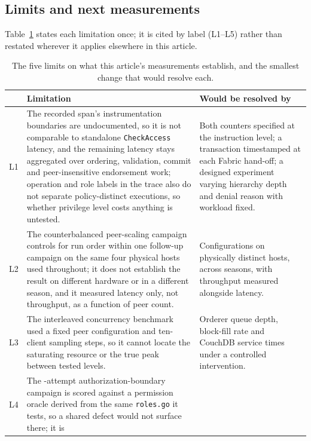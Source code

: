 \documentclass[a4paper,fleqn]{cas-sc}
\begin{document}
\subsection{Limits and next measurements}
\label{subsec:limits}
\label{subsec:threats}

Table~\ref{tab:canonlimits} states each limitation once; it is cited by
label (L1--L5) rather than restated wherever it applies elsewhere in this
article.

\begin{table}[pos=t]
\caption{The five limits on what this article's measurements establish,
  and the smallest change that would resolve each.}
\label{tab:canonlimits}
\small
\begin{tabularx}{\columnwidth}{@{}p{}Xp{}@{}}
\toprule
& Limitation & Would be resolved by \\
\midrule
L1 & The recorded span's instrumentation boundaries are undocumented, so
     it is not comparable to standalone \texttt{CheckAccess} latency, and
     the remaining latency stays aggregated over ordering, validation,
     commit and peer-insensitive endorsement work; operation and role
     labels in the trace also do not separate policy-distinct executions,
     so whether privilege level costs anything is untested. &
     Both counters specified at the instruction level; a transaction
     timestamped at each Fabric hand-off; a designed experiment varying
     hierarchy depth and denial reason with workload fixed. \\
L2 & The counterbalanced peer-scaling campaign controls for run order
     within one follow-up campaign on the same four physical hosts used
     throughout; it does not establish the result on different hardware
     or in a different season, and it measured latency only, not
     throughput, as a function of peer count. &
     Configurations on physically distinct hosts, across seasons, with
     throughput measured alongside latency. \\
L3 & The interleaved concurrency benchmark used a fixed peer
     configuration and ten-client sampling steps, so it cannot locate the
     saturating resource or the true peak between tested levels. &
     Orderer queue depth, block-fill rate and CouchDB service times under
     a controlled intervention. \\
L4 & The \SecAttempts{}-attempt authorization-boundary campaign is scored
     against a permission oracle derived from the same \texttt{roles.go}
     it tests, so a shared defect would not surface there; it is

\end{tabularx}
\end{table}
\end{document}
